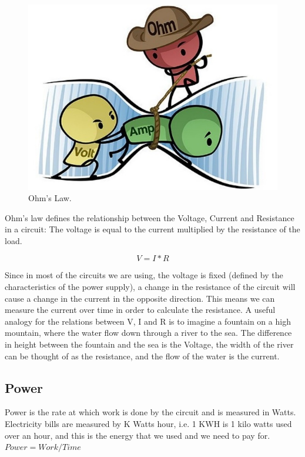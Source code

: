 \begin{figure}[!ht]
	\centering
	\includegraphics{images/ohms_law_cartoon.png}
	\caption{Ohm's Law.} \label{fig:ohms_law_cartoon}
\end{figure}

Ohm's law defines the relationship between the Voltage, Current and Resistance
in a circuit: The voltage is equal to the current multiplied by the resistance
of the load. 

\begin{displaymath}\label{eq:ohm}
    V=I*R
\end{displaymath}

Since in most of the circuits we are using, the voltage is fixed (defined by the
characteristics of the power supply), a change in the resistance of the circuit
will cause a change in the current in the opposite direction. This means we can
measure the current over time in order to calculate the resistance. A useful
analogy for the relations between V, I and R is to imagine a fountain on a high
mountain, where the water flow down through a river to the sea. The difference
in height between the fountain and the sea is the Voltage, the width of the
river can be thought of as the resistance, and the flow of the water is the
current.

\subsection{Power}

Power is the rate at which work is done by the circuit and is measured in Watts.
Electricity bills are measured by K Watts hour, i.e. 1 KWH is 1 kilo watts used
over an hour, and this is the energy that we used and we need to pay for. $Power
= Work / Time$

